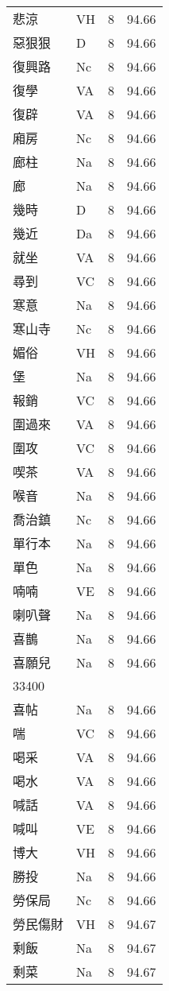 \documentclass[twocolumn]{book}
\begin{document}
\begin{supertabular}{llrr}
悲涼 & VH & 8 &  94.66\\
惡狠狠 & D & 8 &  94.66\\
復興路 & Nc & 8 &  94.66\\
復學 & VA & 8 &  94.66\\
復辟 & VA & 8 &  94.66\\
廂房 & Nc & 8 &  94.66\\
廊柱 & Na & 8 &  94.66\\
廊 & Na & 8 &  94.66\\
幾時 & D & 8 &  94.66\\
幾近 & Da & 8 &  94.66\\
就坐 & VA & 8 &  94.66\\
尋到 & VC & 8 &  94.66\\
寒意 & Na & 8 &  94.66\\
寒山寺 & Nc & 8 &  94.66\\
媚俗 & VH & 8 &  94.66\\
堡 & Na & 8 &  94.66\\
報銷 & VC & 8 &  94.66\\
圍過來 & VA & 8 &  94.66\\
圍攻 & VC & 8 &  94.66\\
喫茶 & VA & 8 &  94.66\\
喉音 & Na & 8 &  94.66\\
喬治鎮 & Nc & 8 &  94.66\\
單行本 & Na & 8 &  94.66\\
單色 & Na & 8 &  94.66\\
喃喃 & VE & 8 &  94.66\\
喇叭聲 & Na & 8 &  94.66\\
喜鵲 & Na & 8 &  94.66\\
喜願兒 & Na & 8 &  94.66\\
33400\\
喜帖 & Na & 8 &  94.66\\
喘 & VC & 8 &  94.66\\
喝采 & VA & 8 &  94.66\\
喝水 & VA & 8 &  94.66\\
喊話 & VA & 8 &  94.66\\
喊叫 & VE & 8 &  94.66\\
博大 & VH & 8 &  94.66\\
勝投 & Na & 8 &  94.66\\
勞保局 & Nc & 8 &  94.66\\
勞民傷財 & VH & 8 &  94.67\\
剩飯 & Na & 8 &  94.67\\
剩菜 & Na & 8 &  94.67\\

\end{supertabular}
\end{document}
